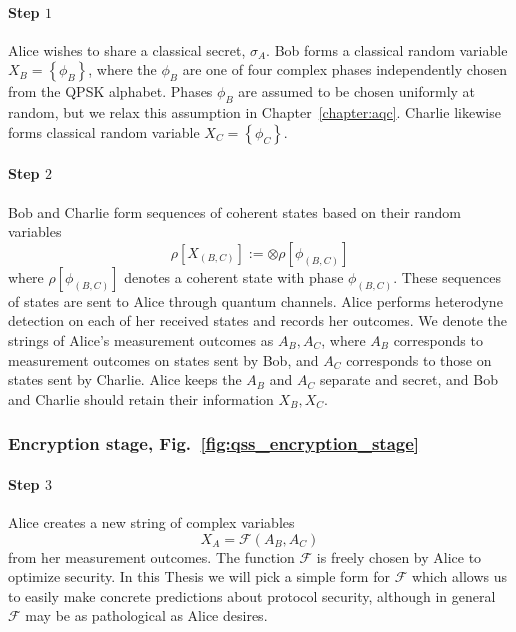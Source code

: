 \paragraph{Step $1$}
Alice wishes to share a classical secret, $\sigma_A$. Bob forms a classical random variable $X_B = \left\{\phi_B\right\}$, where the $\phi_B$ are one of four complex phases independently chosen from the QPSK alphabet. Phases $\phi_B$ are assumed to be chosen uniformly at random, but we relax this assumption in Chapter~\ref{chapter:aqc}. Charlie likewise forms classical random variable $X_C = \left\{\phi_C\right\}$.

\paragraph{Step $2$}
Bob and Charlie form sequences of coherent states based on their random variables
\begin{equation}
\rho\left[X_{\left(B, C\right)}\right] := \otimes \rho\left[\phi_{\left(B, C\right)}\right]
\end{equation}
where $\rho\left[\phi_{\left(B, C\right)}\right]$ denotes a coherent state with phase $\phi_{\left(B, C\right)}$. These sequences of states are sent to Alice through quantum channels. %
Alice performs heterodyne detection on each of her received states and records her outcomes. We denote the strings of Alice's measurement outcomes as $A_B, A_C$, where $A_B$ corresponds to measurement outcomes on states sent by Bob, and $A_C$ corresponds to those on states sent by Charlie. Alice keeps the $A_B$ and $A_C$ separate and secret, and Bob and Charlie should retain their information $X_B, X_C$.

\subsubsection*{Encryption stage, Fig.~\ref{fig:qss_encryption_stage}}

\paragraph{Step $3$} Alice creates a new string of complex variables
\begin{equation}
X_A = \mathcal{F}\left(A_B, A_C\right)
\end{equation}
from her measurement outcomes. The function $\mathcal{F}$ is freely chosen by Alice to optimize security. In this Thesis we will pick a simple form for $\mathcal{F}$ which allows us to easily make concrete predictions about protocol security, although in general $\mathcal{F}$ may be as pathological as Alice desires.



